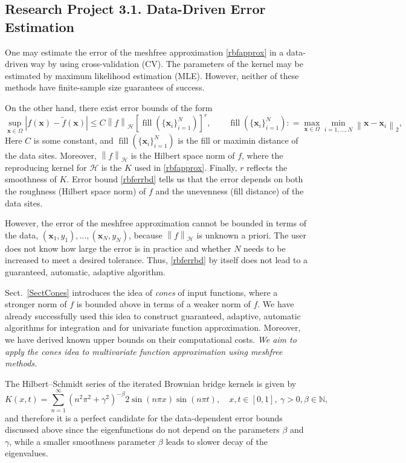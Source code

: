 \documentclass[11pt]{NSFamsart}
\newcommand{\tf}{\tilde{f}}
\newcommand{\bx}{{\boldsymbol{x}}}
\newcommand{\cx}{{\Omega}}
\def\abs#1{\ensuremath{\left \lvert #1 \right \rvert}}
\newcommand{\norm}[2][{}]{\ensuremath{\left \lVert #2 \right \rVert}_{#1}}
\DeclareMathOperator{\filldis}{fill}
\newcommand{\desn}{\{\bx_i\}_{i=1}^N}
\newcommand{\ch}{\mathcal{H}}
\begin{document}
\subsection*{Research Project 3.1. Data-Driven Error Estimation}\label{errestsubsec} One may estimate the error of the meshfree approximation \eqref{rbfapprox} in a data-driven way by using cross-validation (CV).  The parameters of the kernel may be estimated by maximum likelihood estimation (MLE).  However, neither of these methods have finite-sample size guarantees of success.

On the other hand, there exist error bounds of the form \citep{Wen05a}
\begin{equation} \label{rbferrbd}
\sup_{\bx \in \cx} \abs{f(\bx) - \tf(\bx)} \le C \norm[\ch]{f} [\filldis(\desn)]^r, \qquad \filldis(\desn): = \max_{\bx \in \cx} \min_{i=1,  \ldots, N} \norm[2]{\bx - \bx_i},
\end{equation}
Here $C$ is some constant, and $\filldis(\{\bx_i\}_{i=1}^N)$ is the fill or maximin distance of the data sites.  Moreover, $\norm[\ch]{f}$ is the Hilbert space norm of $f$, where the reproducing kernel for $\ch$ is the $K$ used in \eqref{rbfapprox}. Finally, $r$ reflects the smoothness of $K$.  Error bound \eqref{rbferrbd} tells us that the error depends on both the roughness (Hilbert space norm) of $f$ and the unevenness (fill distance) of the data sites.

However, the error of the meshfree approximation cannot be bounded in terms of the data, $(\bx_1, y_1), \ldots, (\bx_N,y_N)$, because $\norm[\ch]{f}$ is unknown a priori.  The user does not know how large the error is in practice and whether $N$ needs to be increased to meet a desired tolerance. Thus, \eqref{rbferrbd} by itself does not lead to a guaranteed, automatic, adaptive algorithm.

Sect.\ \ref{SectCones} introduces the idea of \emph{cones} of input functions, where a stronger norm of $f$ is bounded above in terms of a weaker norm of $f$.  We have already successfully used this idea to construct guaranteed, adaptive, automatic algorithms for integration and for univariate function approximation.  Moreover, we have derived known upper bounds on their computational costs. \emph{We aim to apply the cones idea to multivariate function approximation using meshfree methods.}

The Hilbert--Schmidt series of the iterated Brownian bridge kernels \citep{CavorettoEtAl14} is given by
\begin{equation}\label{IBBkernel}
K(x,t) = \sum_{n=1}^{\infty} \left(n^2\pi^2 + \gamma^2\right)^{-\beta} 2\sin(n\pi x) \sin(n\pi t), \quad x,t \in [0,1],\ \gamma>0, \beta \in \mathbb{N},
\end{equation}
and therefore it is a perfect candidate for the data-dependent error bounds discussed above since the eigenfunctions do not depend on the parameters $\beta$ and $\gamma$, while a smaller smoothness parameter $\beta$ leads to slower decay of the eigenvalues.
\end{document}
